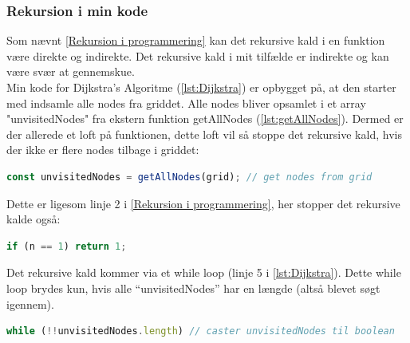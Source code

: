 \documentclass[12pt]{article}
\begin{document}
\subsubsection{Rekursion i min kode}
Som nævnt \ref{Rekursion i programmering} kan det rekursive kald i en funktion være direkte og indirekte. 
Det rekursive kald i mit tilfælde er indirekte og kan være svær at gennemskue. \\
Min kode for Dijkstra’s Algoritme (\ref{lst:Dijkstra}) er opbygget på, at den starter med indsamle alle nodes 
fra griddet. Alle nodes bliver opsamlet i et array "unvisitedNodes" fra ekstern funktion getAllNodes (\ref{lst:getAllNodes}). Dermed er der allerede et loft på funktionen, 
dette loft vil så stoppe det rekursive kald, hvis der ikke er flere nodes tilbage i griddet:
\begin{lstlisting}[language=JavaScript]
const unvisitedNodes = getAllNodes(grid); // get nodes from grid
\end{lstlisting}
Dette er ligesom linje 2 i \ref{Rekursion i programmering}, her stopper det rekursive kalde også: 
\begin{lstlisting}[language=JavaScript]
if (n == 1) return 1;
\end{lstlisting}
Det rekursive kald kommer via et while loop (linje 5 i \ref{lst:Dijkstra}). 
Dette while loop brydes kun, hvis alle “unvisitedNodes” har en længde (altså blevet søgt igennem). 
\begin{lstlisting}[language=JavaScript]
while (!!unvisitedNodes.length) // caster unvisitedNodes til boolean
\end{lstlisting}
\end{document}

